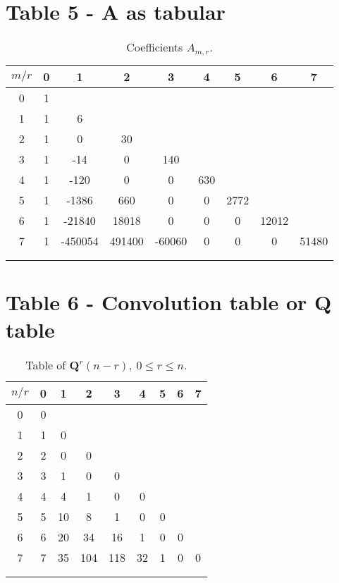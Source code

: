 \documentclass[12pt, letterpaper]{amsart}
\theoremstyle{definition}
\theoremstyle{remark}
\numberwithin{equation}{section}
\begin{document}
\section{Table 5 - A as tabular}
\begin{table}[H]
\begin{tabular}{c|cccccccc}
  $m/r$ &0   &1       &2      &3      &4   &5    &6     &7     \\[3px] \hline
    0   &1   &        &       &       &    &     &      &      \\
    1   &1   &6       &       &       &    &     &      &      \\
    2   &1   &0       &30     &       &    &     &      &      \\
    3   &1   &-14     &0      &140    &    &     &      &      \\
    4   &1   &-120    &0      &0      &630 &     &      &      \\
    5   &1   &-1386   &660    &0      &0   &2772 &      &      \\
    6   &1   &-21840  &18018  &0      &0   &0    &12012 &      \\
    7   &1   &-450054 &491400 &-60060 &0   &0    &0     &51480 \\
  \\\noalign{\smallskip\smallskip}
\end{tabular}
\caption{Coefficients $A_{m,r}$.}
\end{table}
\section{Table 6 - Convolution table or Q table}
\begin{table}[H]
\begin{tabular}{c|cccccccc}
  $n/r$ &0   &1  &2   &3   &4  &5    &6     &7     \\[3px] \hline
    0   &0   &   &    &    &   &     &      &      \\
    1   &1   &0  &    &    &   &     &      &      \\
    2   &2   &0  &0   &    &   &     &      &      \\
    3   &3   &1  &0   &0   &   &     &      &      \\
    4   &4   &4  &1   &0   &0  &     &      &      \\
    5   &5   &10 &8   &1   &0  &0    &      &      \\
    6   &6   &20 &34  &16  &1  &0    &0     &      \\
    7   &7   &35 &104 &118 &32 &1    &0     &0 \\
  \\\noalign{\smallskip\smallskip}
\end{tabular}
\caption{Table of $\mathbf{Q}^r(n-r), \ 0\leq r \leq n$.}
\end{table}
\end{document}
